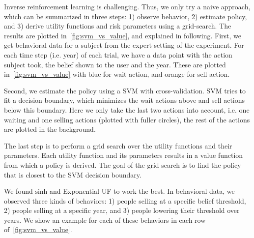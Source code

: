 Inverse reinforcement learning is challenging. Thus, we only try a naive approach, which can be summarized in three steps: 1) observe behavior, 2) estimate policy, and 3) derive utility functions and risk parameters using a grid-search.
The results are plotted in~\autoref{fig:svm_vs_value}, and explained in following. 
First, we get behavioral data for a subject from the expert-setting of the experiment.
For each time step (i.e. year) of each trial, we have a data point with the action subject took, the belief shown to the user and the year. These are plotted in~\autoref{fig:svm_vs_value} with blue for wait action, and orange for sell action.

Second, we estimate the policy using a SVM \cite{svm} with cross-validation. SVM tries to fit a decision boundary, which minimizes the wait actions above and sell actions below this boundary. Here we only take the last two actions into account, i.e. one waiting and one selling actions (plotted with fuller circles), the rest of the actions are plotted in the background.

The last step is to perform a grid search over the utility functions and their parameters.
Each utility function and its parameters results in a value function from which a policy is derived.
The goal of the grid search is to find the policy that is closest to the SVM decision boundary.

We found $\text{sinh}$ and Exponential UF to work the best. In behavioral data, we observed three kinds of behaviors: 1) people selling at a specific belief threshold, 2) people selling at a specific year, and 3) people lowering their threshold over years. We show an example for each of these behaviors in each row of~\autoref{fig:svm_vs_value}.

